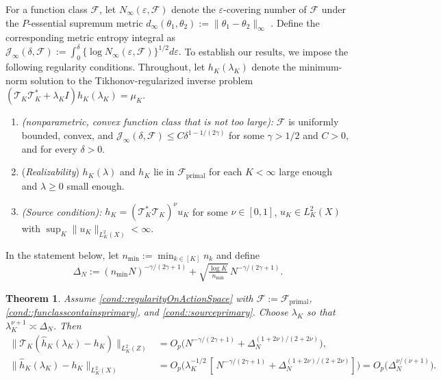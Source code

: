 \documentclass[11pt]{article}
\theoremstyle{plain}
\newtheorem{theorem}{Theorem}
\theoremstyle{definition}
\theoremstyle{remark}
\theoremstyle{definition}
\begin{document}
For a function class \(\mathcal{F}\), let \(N_{\infty}(\varepsilon, \mathcal{F})\) denote the \(\varepsilon\)-covering number of \(\mathcal{F}\) under the \(P\)-essential supremum metric \(d_{\infty}(\theta_1,\theta_2) := \|\theta_1 - \theta_2\|_{\infty}\) \citep[Chapter~2]{vanderVaartWellner}. 
Define the corresponding metric entropy integral as $\mathcal{J}_{\infty}(\delta, \mathcal{F}) := \int_0^{\delta} \{\log N_{\infty}(\varepsilon, \mathcal{F})\}^{1/2} d\varepsilon.$
To establish our results, we impose the following regularity conditions. 
Throughout, let \(h_{K}(\lambda_K)\) denote the minimum-norm solution to the Tikhonov-regularized inverse problem $(\mathcal{T}_{K} \mathcal{T}_{K}^* + \lambda_K I) h_{K}(\lambda_K) = \mu_K.$

\begin{enumerate}[label=\bf{A\arabic*)}, ref={A\arabic*}, series=condA]
\item \textit{(nonparametric, convex function class that is not too large):} \label{cond::regularityOnActionSpace}
   $\mathcal{F}$ is uniformly bounded, convex, and $\mathcal{J}_{\infty}(\delta, \mathcal{F}) \leq C \delta^{1-1/(2\gamma)}$ for some $\gamma > 1/2$ and $C>0$, and for every $\delta > 0$. 
   \item (\textit{Realizability}) \label{cond::funclasscontainsprimary} $h_K(\lambda)$ and $h_K$ lie in $\mathcal{F}_{\mathrm{primal}}$ for each $K < \infty$ large enough and $\lambda \geq 0$ small enough.  
   \item \textit{(Source condition):}  \(h_K = (\mathcal{T}_{K}^*\mathcal{T}_{K} )^{ \nu} u_K \) for some \(\nu \in [0,1]\), \(u_K \in L^2_K(X) \) with $\sup_K \|u_K\|_{L^2_K(X)} < \infty$. \label{cond::sourceprimary} 
\end{enumerate}
 
 
In the statement below, let \(n_{\min} := \min_{k \in [K]} n_k\) and define
\[
\Delta_N 
:= (n_{\min}N)^{-\gamma/(2\gamma+1)} 
   + \sqrt{\tfrac{\log K}{n_{\min}}}\,N^{-\gamma/(2\gamma+1)}.
\]

\begin{theorem}
\label{theorem::weakstrongratessupprimary}
Assume \ref{cond::regularityOnActionSpace} with 
\(\mathcal{F} := \mathcal{F}_{\mathrm{primal}}\), 
\ref{cond::funclasscontainsprimary}, 
and \ref{cond::sourceprimary}.  
Choose \(\lambda_K\) so that 
\(\lambda_K^{\nu+1} \asymp \Delta_N\).  
Then
\begin{align*}
\|\mathcal{T}_K(\widehat{h}_K(\lambda_K) - h_K)\|_{L^2_K(Z)}
&= O_p\!\bigl( N^{-\gamma/(2\gamma+1)} + \Delta_N^{(1+2\nu)/(2+2\nu)} \bigr),\\[0.4em]
\|\widehat{h}_K(\lambda_K) - h_K\|_{L^2_K(X)}
&= O_p\!\bigl( \lambda_K^{-1/2}\,[\, N^{-\gamma/(2\gamma+1)} + \Delta_N^{(1+2\nu)/(2+2\nu)} ] \bigr) = O_p\!\bigl(\Delta_N^{\nu/(\nu+1)}\bigr).
\end{align*}
\end{theorem}
\end{document}
